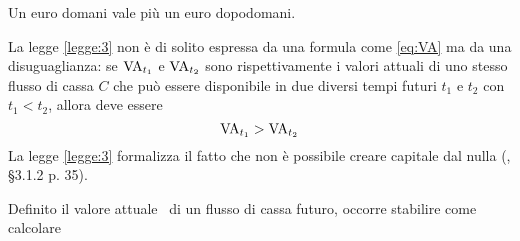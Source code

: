\begin{legge}\label{legge:3}
  Un euro domani vale più un euro dopodomani.
\end{legge}
La legge \ref{legge:3} non è di solito espressa da una formula come \eqref{eq:VA} ma da una disuguaglianza:
se $\mathrm{VA}_{t_1}$ e $\mathrm{VA}_{t_2}$ sono rispettivamente i valori attuali di uno stesso flusso di cassa $C$ che può
essere disponibile in due diversi tempi futuri $t_1$ e $t_2$ con $t_1<t_2$, allora deve essere
\begin{equation}
  \label{eq:legge2}
  \mathrm{VA}_{t_1}>\mathrm{VA}_{t_2}
\end{equation}
La legge \ref{legge:3} formalizza il fatto che non è possibile creare capitale dal nulla (\cite{brealey_et_al1999},
§3.1.2 p. 35).

Definito il valore attuale \VA\ di un flusso di cassa futuro, occorre stabilire come calcolare 